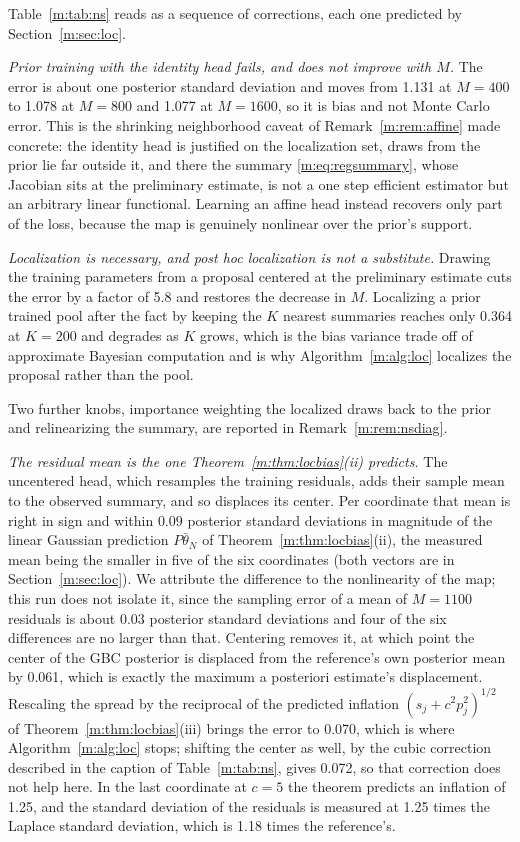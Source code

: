 Table~\ref{m:tab:ns} reads as a sequence of corrections, each one predicted by Section~\ref{m:sec:loc}.

\emph{Prior training with the identity head fails, and does not improve with $M$.} The error is about one posterior standard deviation and moves from 1.131 at $M=400$ to 1.078 at $M=800$ and 1.077 at $M=1600$, so it is bias and not Monte Carlo error. This is the shrinking neighborhood caveat of Remark~\ref{m:rem:affine} made concrete: the identity head is justified on the localization set, draws from the prior lie far outside it, and there the summary \eqref{m:eq:regsummary}, whose Jacobian sits at the preliminary estimate, is not a one step efficient estimator but an arbitrary linear functional. Learning an affine head instead recovers only part of the loss, because the map is genuinely nonlinear over the prior's support.

\emph{Localization is necessary, and post hoc localization is not a substitute.} Drawing the training parameters from a proposal centered at the preliminary estimate cuts the error by a factor of 5.8 and restores the decrease in $M$. Localizing a prior trained pool after the fact by keeping the $K$ nearest summaries reaches only 0.364 at $K=200$ and degrades as $K$ grows, which is the bias variance trade off of approximate Bayesian computation and is why Algorithm~\ref{m:alg:loc} localizes the proposal rather than the pool.

Two further knobs, importance weighting the localized draws back to the prior and relinearizing the summary, are reported in Remark~\ref{m:rem:nsdiag}.

\emph{The residual mean is the one Theorem~\ref{m:thm:locbias}(ii) predicts.} The uncentered head, which resamples the training residuals, adds their sample mean to the observed summary, and so displaces its center. Per coordinate that mean is right in sign and within $0.09$ posterior standard deviations in magnitude of the linear Gaussian prediction $P\bar\theta_N$ of Theorem~\ref{m:thm:locbias}(ii), the measured mean being the smaller in five of the six coordinates (both vectors are in Section~\ref{m:sec:loc}). We attribute the difference to the nonlinearity of the map; this run does not isolate it, since the sampling error of a mean of $M=1100$ residuals is about $0.03$ posterior standard deviations and four of the six differences are no larger than that. Centering removes it, at which point the center of the GBC posterior is displaced from the reference's own posterior mean by 0.061, which is exactly the maximum a posteriori estimate's displacement. Rescaling the spread by the reciprocal of the predicted inflation $(s_j+c^2p_j^2)^{1/2}$ of Theorem~\ref{m:thm:locbias}(iii) brings the error to 0.070, which is where Algorithm~\ref{m:alg:loc} stops; shifting the center as well, by the cubic correction described in the caption of Table~\ref{m:tab:ns}, gives 0.072, so that correction does not help here. In the last coordinate at $c=5$ the theorem predicts an inflation of 1.25, and the standard deviation of the residuals is measured at 1.25 times the Laplace standard deviation, which is 1.18 times the reference's.


